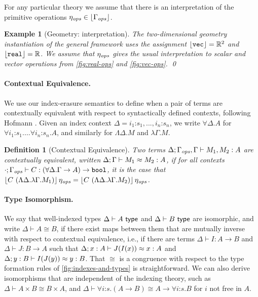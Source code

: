 \documentclass{sigplanconf}
\newcommand{\tyPrimNm}[1]{\textup{\texttt{#1}}}
\newcommand{\isType}{\textup{\textsf{ type}}}
\newcommand{\ctxtSem}[1]{\left\lfloor #1 \right\rfloor}
\newcommand{\tmSem}[1]{\left\lfloor{#1}\right\rfloor}
\newcommand{\tyPrimSem}[1]{\left\lfloor #1 \right\rfloor}
\newtheorem{definition}{Definition}
\theoremstyle{examplestyle}
\newtheorem*{example*}{Example}
\theoremstyle{restatementstyle}
\begin{document}
For any particular theory we assume that there is an
interpretation of the primitive operations $\opsEnv \in \ctxtSem{\opsCtxt}$.

\begin{example*}[Geometry: interpretation]
  The two-dimensional geometry instantiation of the general framework
  uses the assignment $\tyPrimSem{\tyPrimNm{vec}} = \mathbb{R}^2$ and
  $\tyPrimSem{\tyPrimNm{real}} = \mathbb{R}$.
  We assume that $\eta_{\mathit{ops}}$ gives the usual interpretation to scalar
  and vector operations from
  \autoref{fig:real-ops} and \autoref{fig:vec-ops}.
\qed
\end{example*}



\paragraph{Contextual Equivalence.}
We use our index-erasure semantics to define when a pair of terms are
contextually equivalent with respect to syntactically defined
contexts, following Hofmann \cite{hofmann08correctness}.  Given an
index context $\Delta = i_1\mathord:s_1,...,i_n\mathord:s_n$, we write
$\forall \Delta.A$ for $\forall i_1\mathord:s_1.\dots\forall
i_n\mathord:s_n.A$, and similarly for $\Lambda\Delta.M$ and $\lambda
\Gamma.M$.
\begin{definition}[Contextual Equivalence]\label{defn:ctxt-equiv}
Two terms $\Delta; \Gamma_{\mathit{ops}}, \Gamma \vdash M_1, M_2 : A$
are \emph{contextually equivalent}, written ${\Delta};{\Gamma}\vdash{M_1}\approx{M_2}:{A}$, if 
  for all
  contexts $\cdot;\opsCtxt \vdash C : (\forall \Delta. \Gamma
  \to A) \to \tyPrimNm{bool}$, it is the case that $\tmSem{C\ (\Lambda
    \Delta. \lambda \Gamma. M_1)}\opsEnv = \tmSem{C\
    (\Lambda \Delta. \lambda \Gamma. M_2)}\opsEnv$.
\end{definition}


\paragraph{Type Isomorphism.}
We say that well-indexed types $\Delta \vdash A \isType$ and $\Delta\vdash B \isType$
are isomorphic, and write $\Delta\vdash A \cong
B$, if there exist maps between them that are mutually inverse with
respect to contextual equivalence, i.e., if there are terms $\Delta\vdash I
: A \to B$ and $\Delta\vdash J : B\to A$ such that ${\Delta};{x:A}\vdash{J(I(x))}\approx{x}:{A}$ 
and ${\Delta};{y:B}\vdash{I(J(y))}\approx{y}:{B}$.
That $\cong$ is a congruence with respect to the type formation rules
of \autoref{fig:indexes-and-types} is straightforward. We can also
derive isomorphisms that are independent of the indexing theory, such
as $\Delta\vdash A\times B \cong B \times A$, and $\Delta\vdash\forall
i\mathord:s.(A\to B)\cong A\to\forall i\mathord:s.B$ for $i$ not free in $A$.
\end{document}
